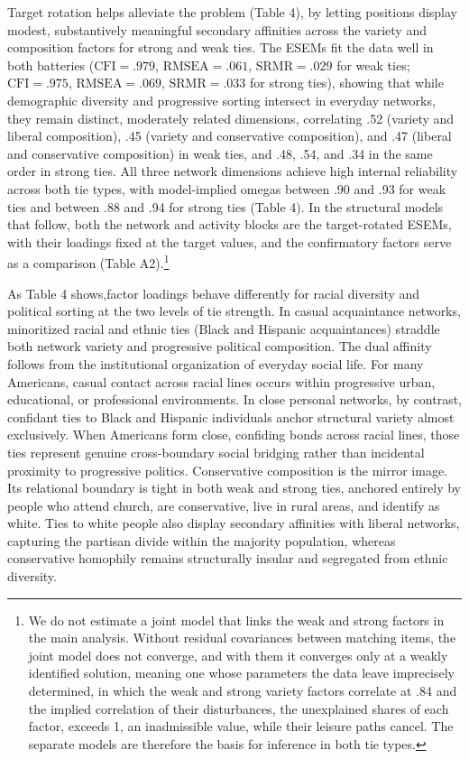 \documentclass[
  12pt
]{article}
\begin{document}
Target rotation helps alleviate the problem (Table 4), by letting positions display modest, substantively meaningful secondary affinities across the variety and composition factors for strong and weak ties. The ESEMs fit the data well in both batteries ($\text{CFI} = .979$, $\text{RMSEA} = .061$, $\text{SRMR} = .029$ for weak ties; $\text{CFI} = .975$, $\text{RMSEA} = .069$, $\text{SRMR} = .033$ for strong ties), showing that while demographic diversity and progressive sorting intersect in everyday networks, they remain distinct, moderately related dimensions, correlating .52 (variety and liberal composition), .45 (variety and conservative composition), and .47 (liberal and conservative composition) in weak ties, and .48, .54, and .34 in the same order in strong ties. All three network dimensions achieve high internal reliability across both tie types, with model-implied omegas between .90 and .93 for weak ties and between .88 and .94 for strong ties (Table 4). In the structural models that follow, both the network and activity blocks are the target-rotated ESEMs, with their loadings fixed at the target values, and the confirmatory factors serve as a comparison (Table A2).\footnote{We do not estimate a joint model that links the weak and strong factors in the main analysis. Without residual covariances between matching items, the joint model does not converge, and with them it converges only at a weakly identified solution, meaning one whose parameters the data leave imprecisely determined, in which the weak and strong variety factors correlate at .84 and the implied correlation of their disturbances, the unexplained shares of each factor, exceeds 1, an inadmissible value, while their leisure paths cancel. The separate models are therefore the basis for inference in both tie types.}

As Table 4 shows,factor loadings behave differently for racial diversity and political sorting at the two levels of tie strength. In casual acquaintance networks, minoritized racial and ethnic ties (Black and Hispanic acquaintances) straddle both network variety and progressive political composition. The dual affinity follows from the institutional organization of everyday social life. For many Americans, casual contact across racial lines occurs within progressive urban, educational, or professional environments. In close personal networks, by contrast, confidant ties to Black and Hispanic individuals anchor structural variety almost exclusively. When Americans form close, confiding bonds across racial lines, those ties represent genuine cross-boundary social bridging rather than incidental proximity to progressive politics. Conservative composition is the mirror image. Its relational boundary is tight in both weak and strong ties, anchored entirely by people who attend church, are conservative, live in rural areas, and identify as white. Ties to white people also display secondary affinities with liberal networks, capturing the partisan divide within the majority population, whereas conservative homophily remains structurally insular and segregated from ethnic diversity.
\end{document}
